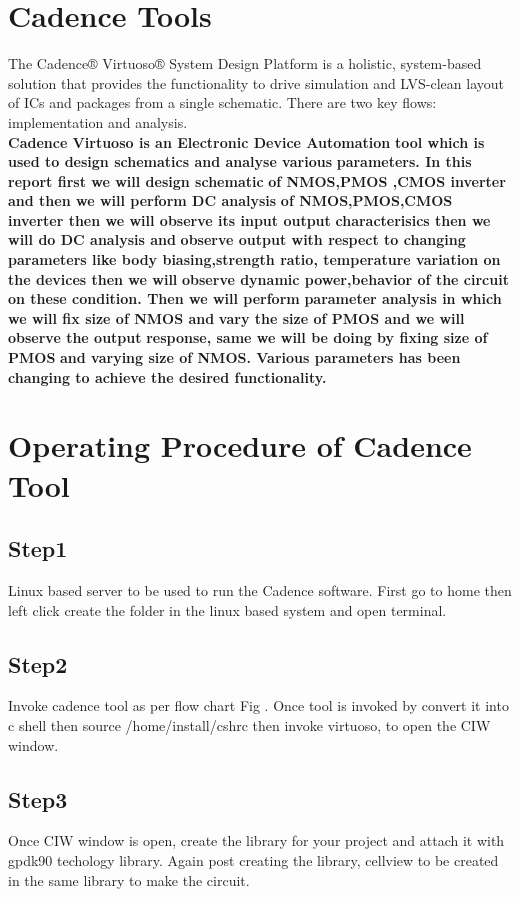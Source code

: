 \documentclass[conference]{IEEEtran}
\begin{document}
\section{Cadence Tools}
The Cadence® Virtuoso® System Design Platform is a holistic, system-based solution that provides the functionality to drive simulation and LVS-clean layout of ICs and packages from a single schematic. There are two key flows: implementation and analysis. \textbf{
\\Cadence Virtuoso is an Electronic Device Automation }\textbf{tool which is used to design schematics and analyse various }\textbf{parameters. In this report first we will design schematic }\textbf{of NMOS,PMOS ,CMOS inverter and then we will perform DC analysis }\textbf{of NMOS,PMOS,CMOS inverter then we will observe its input output }\textbf{characterisics then we will do DC analysis  and }\textbf{observe output with respect to changing parameters like body biasing,strength ratio, temperature variation on the devices  then we will }\textbf{observe dynamic power,behavior of the circuit on these condition. Then we will perform }\textbf{parameter analysis in which we will fix size of NMOS and }\textbf{vary the size of PMOS and we will observe the output }\textbf{response, same we will be doing by fixing size of PMOS }\textbf{and varying size of NMOS. Various parameters has been changing to achieve the desired functionality.}

\section{Operating Procedure of Cadence Tool}
\subsection{Step1}
Linux based server to be used to run the Cadence software. First go to home then left click  create the folder in the linux based system and open terminal.   
\subsection{Step2}
Invoke cadence tool as per flow chart Fig . Once tool is invoked by convert it into c shell then source /home/install/cshrc then invoke virtuoso,  to open the CIW window.
\subsection{Step3}
Once CIW window is open, create the library for your project and attach it with gpdk90 techology library. Again post creating the library, cellview to be created in the same library to make the circuit.
\end{document}
